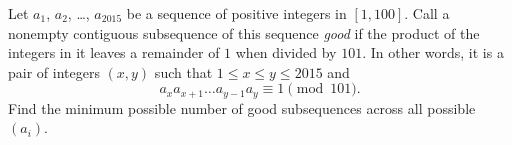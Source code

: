 Let $a_1$, $a_2$, \dots, $a_{2015}$ be a sequence of positive integers in $[1,100]$.
Call a nonempty contiguous subsequence of this sequence \emph{good} if the product of the integers in it leaves a remainder of $1$ when divided by $101$.
In other words, it is a pair of integers $(x, y)$ such that $1 \le x \le y \le 2015$ and \[a_xa_{x+1}\dots a_{y-1}a_y \equiv 1 \pmod{101}. \]Find the minimum possible number of good subsequences across all possible $(a_i)$.
